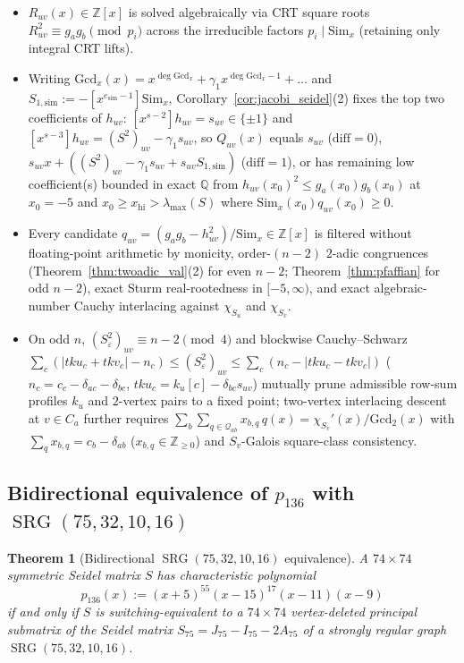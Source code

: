 \documentclass[11pt,reqno]{amsart}
\newtheorem{theorem}{Theorem}[section]
\theoremstyle{definition}
\theoremstyle{remark}
\numberwithin{equation}{section}
\numberwithin{table}{section}
\DeclareMathOperator{\SRG}{SRG}
\begin{document}
\begin{itemize}
  \item $R_{uv}(x) \in \mathbb{Z}[x]$ is solved algebraically via CRT square roots $R_{uv}^2 \equiv g_a g_b \pmod{p_i}$ across the irreducible factors $p_i \mid \mathrm{Sim}_x$ (retaining only integral CRT lifts).
  \item Writing $\mathrm{Gcd}_x(x) = x^{\deg\mathrm{Gcd}_x} + \gamma_1 x^{\deg\mathrm{Gcd}_x - 1} + \dots$ and $S_{1,\mathrm{sim}} := -[x^{e_{\mathrm{sim}}-1}]\mathrm{Sim}_x$, Corollary~\ref{cor:jacobi_seidel}(2) fixes the top two coefficients of $h_{uv}$: $[x^{s-2}]h_{uv} = s_{uv} \in \{\pm 1\}$ and $[x^{s-3}]h_{uv} = (S^2)_{uv} - \gamma_1 s_{uv}$, so $Q_{uv}(x)$ equals $s_{uv}$ ($\mathrm{diff}=0$), $s_{uv}x + ((S^2)_{uv} - \gamma_1 s_{uv} + s_{uv}S_{1,\mathrm{sim}})$ ($\mathrm{diff}=1$), or has remaining low coefficient(s) bounded in exact $\mathbb{Q}$ from $h_{uv}(x_0)^2 \le g_a(x_0)g_b(x_0)$ at $x_0 = -5$ and $x_0 \ge x_{\mathrm{hi}} > \lambda_{\max}(S)$ where $\mathrm{Sim}_x(x_0)q_{uv}(x_0) \ge 0$.
  \item Every candidate $q_{uv} = (g_a g_b - h_{uv}^2)/\mathrm{Sim}_x \in \mathbb{Z}[x]$ is filtered without floating-point arithmetic by monicity, order-$(n-2)$ $2$-adic congruences (Theorem~\ref{thm:twoadic_val}(2) for even $n-2$; Theorem~\ref{thm:pfaffian} for odd $n-2$), exact Sturm real-rootedness in $[-5, \infty)$, and exact algebraic-number Cauchy interlacing against $\chi_{S_u}$ and $\chi_{S_v}$.
  \item On odd $n$, $(S_\varepsilon^2)_{uv} \equiv n - 2 \pmod 4$ and blockwise Cauchy--Schwarz $\sum_c (|tku_c + tkv_c| - n_c) \le (S_\varepsilon^2)_{uv} \le \sum_c (n_c - |tku_c - tkv_c|)$ ($n_c = c_c - \delta_{ac} - \delta_{bc}$, $tku_c = k_u[c] - \delta_{bc}s_{uv}$) mutually prune admissible row-sum profiles $k_u$ and $2$-vertex pairs to a fixed point; two-vertex interlacing descent at $v \in C_a$ further requires $\sum_{b} \sum_{q \in \mathcal{Q}_{ab}} x_{b,q}\,q(x) = \chi_{S_v}'(x)/\mathrm{Gcd}_2(x)$ with $\sum_q x_{b,q} = c_b - \delta_{ab}$ ($x_{b,q} \in \mathbb{Z}_{\ge 0}$) and $S_v$-Galois square-class consistency.
\end{itemize}

\subsection{Bidirectional equivalence of \texorpdfstring{$p_{136}$}{p\_136} with \texorpdfstring{$\SRG(75, 32, 10, 16)$}{SRG(75, 32, 10, 16)}}
\begin{theorem}[Bidirectional $\SRG(75, 32, 10, 16)$ equivalence]\label{thm:srg136}
A $74 \times 74$ symmetric Seidel matrix $S$ has characteristic polynomial
\[
  p_{136}(x) := (x + 5)^{55}(x - 15)^{17}(x - 11)(x - 9)
\]
if and only if $S$ is switching-equivalent to a $74 \times 74$ vertex-deleted principal submatrix of the Seidel matrix $S_{75} = J_{75} - I_{75} - 2A_{75}$ of a strongly regular graph $\SRG(75, 32, 10, 16)$.
\end{theorem}
\end{document}

